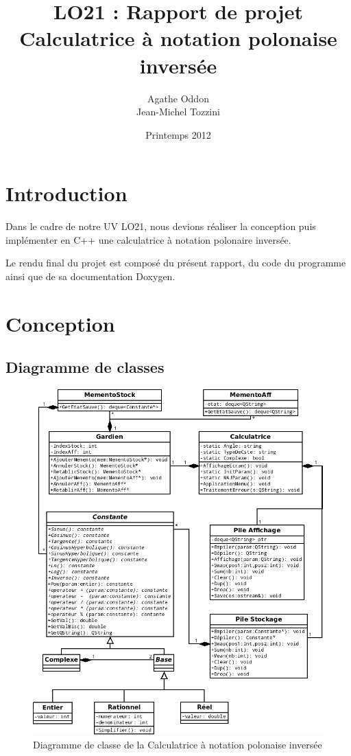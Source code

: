 \documentclass[a4paper,11pt]{article}
\begin{document}
\title{LO21 : Rapport de projet\\Calculatrice à notation polonaise inversée}
\author{Agathe Oddon\\Jean-Michel Tozzini}
\date{Printemps 2012}

\maketitle

\section*{Introduction}
Dans le cadre de notre UV LO21, nous devions réaliser la conception puis implémenter en C++ une calculatrice à notation polonaire inversée.

Le rendu final du projet est composé du présent rapport, du code du programme ainsi que de sa documentation Doxygen.

\tableofcontents

\section{Conception}
\subsection{Diagramme de classes}
\begin{figure}[H]
	\center
	\includegraphics[width=16.7cm]{UMLProjetLO21v3.png}
	\caption{Diagramme de classe de la Calculatrice à notation polonaise inversée}
\end{figure}
\end{document}
